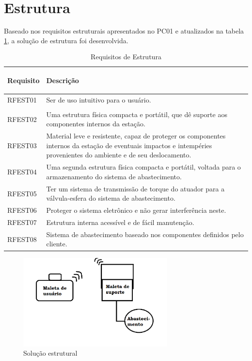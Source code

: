 \section{Estrutura}

\par Baseado nos requisitos estruturais apresentados no PC01 e atualizados na tabela \ref{tab:Requisitos de Estrutura}, a solução de estrutura foi desenvolvida.

\begin{table}[H]
\centering
\begin{tabular}{ | m{2cm} | m{12cm}| } 
 \hline
 \textbf{Requisito} & \begin{center}\textbf{Descrição}
   
 \end{center} \\ 
 \hline
 RFEST01 & Ser de uso intuitivo para o usuário.\\
 & \\
\hline
 RFEST02 & Uma estrutura física compacta e portátil, que dê suporte aos componentes internos da estação. \\
 \hline
 RFEST03 & Material leve e resistente, capaz de proteger os componentes internos da estação de eventuais impactos e intempéries provenientes do ambiente e de seu deslocamento. \\
  \hline
RFEST04 & Uma segunda estrutura física compacta e portátil, voltada para o armazenamento do sistema de abastecimento. \\
\hline
RFEST05 & Ter um sistema de transmissão de torque do atuador para a válvula-esfera do sistema de abastecimento. \\
\hline
RFEST06 & Proteger o sistema eletrônico e não gerar interferência neste.  \\
\hline
RFEST07 & Estrutura interna acessível e de fácil manutenção. \\
\hline
RFEST08 & Sistema de abastecimento baseado nos componentes definidos pelo cliente. \\
\hline
\end{tabular}
\caption{Requisitos de Estrutura}
\label{tab:Requisitos de Estrutura}
\end{table}

\begin{figure}[!h]
	\centering
	\label{bateria_maleta}
		\includegraphics[width=0.7\textwidth]{figuras/estrutura.png}
	\caption{Solução estrutural}
	\label{soluçao_estrut}
	\end{figure}

